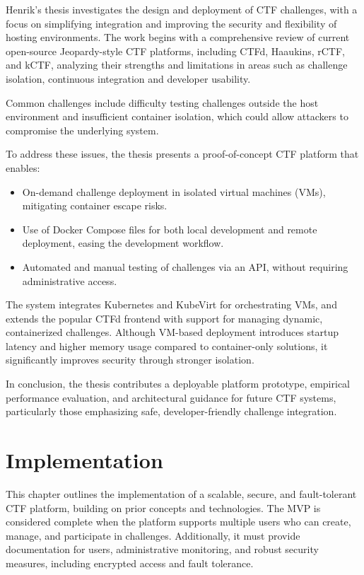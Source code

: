 Henrik's thesis investigates the design and deployment of CTF challenges, with a focus on simplifying integration and improving the security and flexibility of hosting environments. The work begins with a comprehensive review of current open-source Jeopardy-style CTF platforms, including CTFd, Haaukins, rCTF, and kCTF, analyzing their strengths and limitations in areas such as challenge isolation, continuous integration and developer usability. 

Common challenges include difficulty testing challenges outside the host environment and insufficient container isolation, which could allow attackers to compromise the underlying system.

To address these issues, the thesis presents a proof-of-concept CTF platform that enables:

\begin{itemize}
    \item On-demand challenge deployment in isolated virtual machines (VMs), mitigating container escape risks.
    \item Use of Docker Compose files for both local development and remote deployment, easing the development workflow.
    \item Automated and manual testing of challenges via an API, without requiring administrative access.
\end{itemize}

The system integrates Kubernetes and KubeVirt for orchestrating VMs, and extends the popular CTFd frontend with support for managing dynamic, containerized challenges. Although VM-based deployment introduces startup latency and higher memory usage compared to container-only solutions, it significantly improves security through stronger isolation.

In conclusion, the thesis contributes a deployable platform prototype, empirical performance evaluation, and architectural guidance for future CTF systems, particularly those emphasizing safe, developer-friendly challenge integration.

\chapter{Implementation}\label{chap:implementation}
This chapter outlines the implementation of a scalable, secure, and fault-tolerant CTF platform, building on prior concepts and technologies. The MVP is considered complete when the platform supports multiple users who can create, manage, and participate in challenges. Additionally, it must provide documentation for users, administrative monitoring, and robust security measures, including encrypted access and fault tolerance.

